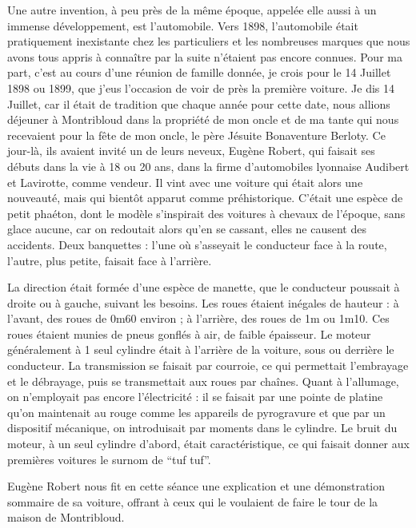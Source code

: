 \documentclass[11pt,a4paper]{report}
\begin{document}
Une autre invention, à peu près de la même époque, appelée elle aussi à un immense développement, est l'automobile. Vers 1898, l'automobile était pratiquement inexistante chez les particuliers et les nombreuses marques que nous avons tous appris à connaître par la suite n'étaient pas encore connues. Pour ma part, c'est au cours d'une réunion de famille donnée, je crois pour le 14 Juillet 1898 ou 1899, que j'eus l'occasion de voir de près la première voiture. Je dis 14 Juillet, car il était de tradition que chaque année pour cette date, nous allions déjeuner à Montribloud dans la propriété de mon oncle et de ma tante qui nous recevaient pour la fête de mon oncle, le père Jésuite Bonaventure Berloty. Ce jour-là, ils avaient invité un de leurs neveux, Eugène Robert, qui faisait ses débuts dans la vie à 18 ou 20 ans, dans la firme d'automobiles lyonnaise Audibert et Lavirotte, comme vendeur. Il vint avec une voiture qui était alors une nouveauté, mais qui bientôt apparut comme préhistorique. C'était une espèce de petit phaéton, dont le modèle s'inspirait des voitures à chevaux de l'époque, sans glace aucune, car on redoutait alors qu'en se cassant, elles ne causent des accidents. Deux banquettes : l'une où s'asseyait le conducteur face à la route, l'autre, plus petite, faisait face à l'arrière.

La direction était formée d'une espèce de manette, que le conducteur poussait à droite ou à gauche, suivant les besoins. Les roues étaient inégales de hauteur : à l'avant, des roues de 0m60 environ ; à l'arrière, des roues de 1m ou 1m10. Ces roues étaient munies de pneus gonflés à air, de faible épaisseur. Le moteur généralement à 1 seul cylindre était à l'arrière de la voiture, sous ou derrière le conducteur. La transmission se faisait par courroie, ce qui permettait l'embrayage et le débrayage, puis se transmettait aux roues par chaînes. Quant à l'allumage, on n'employait pas encore l'électricité : il se faisait par une pointe de platine qu'on maintenait au rouge comme les appareils de pyrogravure et que par un dispositif mécanique, on introduisait par moments dans le cylindre. Le bruit du moteur, à un seul cylindre d'abord, était caractéristique, ce qui faisait donner aux premières voitures le surnom de ``tuf tuf''.

Eugène Robert nous fit en cette séance une explication et une démonstration sommaire de sa voiture, offrant à ceux qui le voulaient de faire le tour de la maison de Montribloud.
\end{document}

